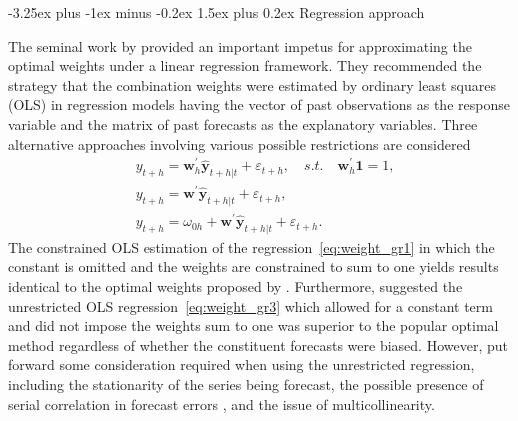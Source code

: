 \documentclass[11pt]{article}
\makeatletter
\renewcommand{\paragraph}{\@startsection{paragraph}{4}{0ex}%
   {-3.25ex plus -1ex minus -0.2ex}%
   {1.5ex plus 0.2ex}%
   {\normalfont\normalsize\bfseries}}
\makeatother
\begin{document}

\paragraph{Regression approach}

The seminal work by \cite{Granger1984-jc} provided an important impetus for approximating the optimal weights under a linear regression framework. They recommended the strategy that the combination weights were estimated by ordinary least squares (OLS) in regression models having the vector of past observations as the response variable and the matrix of past forecasts as the explanatory variables. Three alternative approaches involving various possible restrictions are considered
\begin{align}
&y_{t+h}=\boldsymbol{w}_{h}^{\prime} \hat{\mathbf{y}}_{t+h|t}+\varepsilon_{t+h}, \quad s.t. \quad \boldsymbol{w}_{h}^{\prime}\mathbf{1}=1, \label{eq:weight_gr1}\\
&y_{t+h}=\boldsymbol{w}^{\prime} \hat{\mathbf{y}}_{t+h|t}+\varepsilon_{t+h}, \label{eq:weight_gr2}\\
&y_{t+h}=\omega_{0h}+\boldsymbol{w}^{\prime} \hat{\mathbf{y}}_{t+h|t}+\varepsilon_{t+h}. \label{eq:weight_gr3}
\end{align}
The constrained OLS estimation of the regression~\eqref{eq:weight_gr1} in which the constant is omitted and the weights are constrained to sum to one yields results identical to the optimal weights proposed by \cite{Bates1969-yj}. Furthermore, \cite{Granger1984-jc} suggested the unrestricted OLS regression~\eqref{eq:weight_gr3} which allowed for a constant term and did not impose the weights sum to one was superior to the popular optimal method regardless of whether the constituent forecasts were biased. However, \cite{De_Menezes2000-vd} put forward some consideration required when using the unrestricted regression, including the stationarity of the series being forecast, the possible presence of serial correlation in forecast errors \citep[see also][]{Diebold1988-sx,Edward_Coulson1993-db}, and the issue of multicollinearity.
\end{document}
